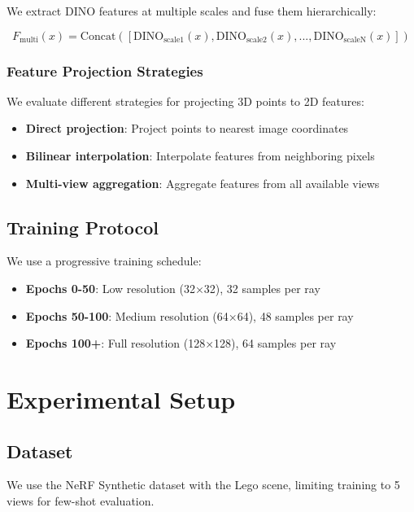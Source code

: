\documentclass[11pt]{article}
\begin{document}
We extract DINO features at multiple scales and fuse them hierarchically:

\begin{equation}
F_{\text{multi}}(x) = \text{Concat}([\text{DINO}_{\text{scale1}}(x), \text{DINO}_{\text{scale2}}(x), ..., \text{DINO}_{\text{scaleN}}(x)])
\end{equation}

\subsubsection{Feature Projection Strategies}

We evaluate different strategies for projecting 3D points to 2D features:
\begin{itemize}
    \item \textbf{Direct projection}: Project points to nearest image coordinates
    \item \textbf{Bilinear interpolation}: Interpolate features from neighboring pixels
    \item \textbf{Multi-view aggregation}: Aggregate features from all available views
\end{itemize}

\subsection{Training Protocol}

We use a progressive training schedule:
\begin{itemize}
    \item \textbf{Epochs 0-50}: Low resolution (32×32), 32 samples per ray
    \item \textbf{Epochs 50-100}: Medium resolution (64×64), 48 samples per ray  
    \item \textbf{Epochs 100+}: Full resolution (128×128), 64 samples per ray
\end{itemize}

\section{Experimental Setup}

\subsection{Dataset}

We use the NeRF Synthetic dataset \cite{mildenhall2020nerf} with the Lego scene, limiting training to 5 views for few-shot evaluation.
\end{document}
